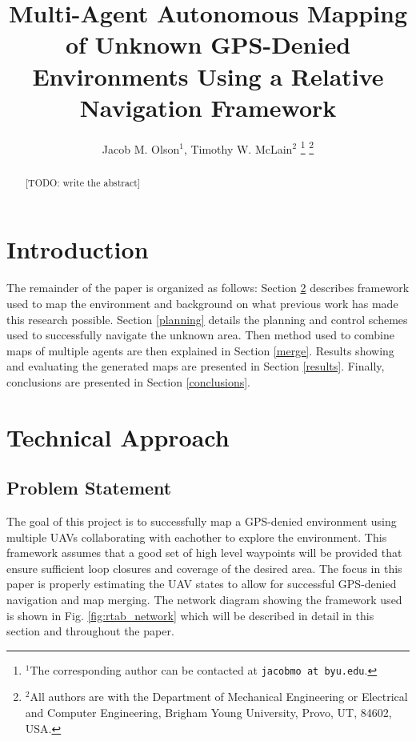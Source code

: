 \documentclass[letterpaper, 10 pt, conference]{ieeeconf}  %
\title{\LARGE \bf
Multi-Agent Autonomous Mapping of Unknown GPS-Denied Environments Using a Relative Navigation Framework}
\author{Jacob M. Olson$^{1}$, Timothy W. McLain$^{2}$ \todo{include Matthiew Labbe?}%
\thanks{$^{1}$The corresponding author can be contacted at
        {\tt\small jacobmo at byu.edu}.}%
\thanks{$^{2}$All authors are with the Department of Mechanical Engineering or Electrical and Computer Engineering,
        Brigham Young University, Provo, UT, 84602, USA.}%
}
\newcommand{\todo}[1]{{\color{blue}[TODO: #1]}}
\begin{document}
\maketitle
\thispagestyle{empty}
\pagestyle{empty}


\begin{abstract}

\todo{write the abstract}

\end{abstract}


\section{Introduction}

The remainder of the paper is organized as follows: Section \ref{approach} describes framework used to map the environment and background on what previous work has made this research possible. Section \ref{planning} details the planning and control schemes used to successfully navigate the unknown area. Then method used to combine maps of multiple agents are then explained in Section \ref{merge}. Results showing and evaluating the generated maps are presented in Section \ref{results}. Finally, conclusions are presented in Section \ref{conclusions}.

\section{Technical Approach}\label{approach}

\subsection{Problem Statement}

The goal of this project is to successfully map a GPS-denied environment using multiple UAVs collaborating with eachother to explore the environment. This framework assumes that a good set of high level waypoints will be provided that ensure sufficient loop closures and coverage of the desired area. The focus in this paper is properly estimating the UAV states to allow for successful GPS-denied navigation and map merging. The network diagram showing the framework used is shown in Fig. \ref{fig:rtab_network} which will be described in detail in this section and throughout the paper.
\end{document}
